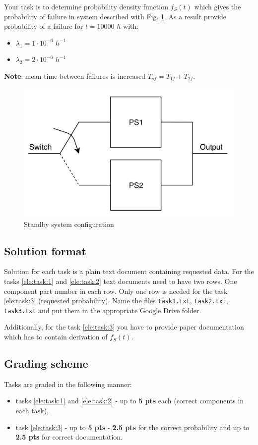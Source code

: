 \documentclass{article}
\begin{document}
Your task is to determine probability density function $f_S(t)$ which gives the
probability of failure in system described with Fig. \ref{fig:psc}. As a result 
provide probability of a failure for $t = 10000$ $h$ with:
\begin{itemize}
	\item[] $\lambda_1 = 1 \cdot10^{-6}$ $h^{-1}$
	\item[] $\lambda_2 = 2 \cdot10^{-6}$ $h^{-1}$ 
\end{itemize} 

\textbf{Note}: mean time between failures is increased $T_{sf} = 
T_{1f} + T_{2f}$. 

\begin{figure}[h!]
	\centering
	\includegraphics[width=\linewidth]{standby.png}
	\caption{Standby system configuration}
	\label{fig:psc}
\end{figure}

\newpage

\subsection{Solution format}
Solution for each task is a plain text document containing requested data. For
the tasks \ref{ele:task:1} and \ref{ele:task:2} text documents need to have 
two rows. One component part number in each row. Only one row is needed for the 
task \ref{ele:task:3} (requested probability). Name the files 
\texttt{task1.txt}, \texttt{task2.txt}, \texttt{task3.txt} and put them in 
the appropriate Google Drive folder.

Additionally, for the task \ref{ele:task:3} you have to provide paper 
documentation which has to contain derivation of $f_S(t)$.

\subsection{Grading scheme}
Tasks are graded in the following manner:
\begin{itemize}
	\item tasks \ref{ele:task:1} and \ref{ele:task:2} - up to \textbf{5 pts} 
	each (correct components in each task), 
	\item task \ref{ele:task:3} - up to \textbf{5 pts} - \textbf{2.5 pts} for 
	the correct probability and up to \textbf{2.5 pts} for correct 
	documentation.
\end{itemize}
\end{document}
